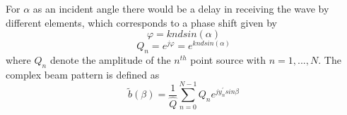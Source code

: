 \noindent For $\alpha$ as an incident angle there would be a delay in receiving the wave by different elements, which corresponds to a phase shift given by
\begin{equation*}
 \varphi = knd sin(\alpha)
 \end{equation*}
 \begin{equation*}
 Q_{n} = e^{j\varphi} = e^{knd sin(\alpha)}
 \end{equation*}
 \noindent where \textit{$Q_{n}$} denote the amplitude of the $n^{th}$ point source with $n = 1,...,N.$  The complex beam pattern is defined as 
 \begin{equation*}
 \tilde{b}(\beta) = \frac{1}{\hat{Q}} \sum_{n=0}^{N-1}Q_{n} e^{j{y_{n}^{'}} sin\beta}
 \end{equation*}
 